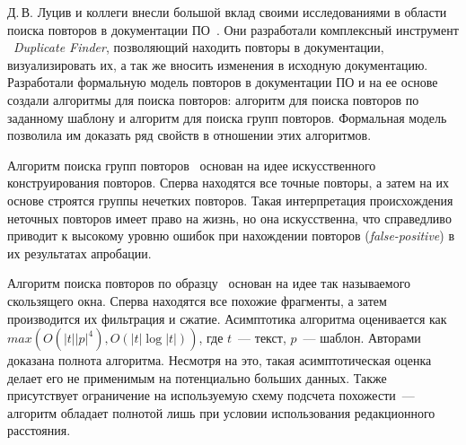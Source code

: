 

Д.\,В. Луцив и коллеги внесли большой вклад своими исследованиями в области поиска повторов в документации ПО~\cite{luciv2018detecting,luciv2018duplicate,luciv2019interactive,koznov2015clone,koznov2017duplicate,luciv2016fuzzy}. 
Они разработали комплексный инструмент \
\emph{Duplicate Finder}, позволяющий  находить повторы в документации, визуализировать их, а так же вносить изменения в исходную документацию.
Разработали формальную модель повторов в документации ПО и на ее основе создали алгоритмы для поиска повторов:  алгоритм для поиска повторов по заданному шаблону и  алгоритм для поиска групп повторов.
Формальная модель позволила им доказать ряд свойств в отношении этих алгоритмов.

Алгоритм поиска групп повторов~\cite{luciv2016fuzzy} основан на идее искусственного конструирования повторов.
Сперва находятся все точные повторы, а затем на их основе строятся группы нечетких повторов.
Такая интерпретация происхождения неточных повторов имеет право на жизнь, но она искусственна, что справедливо приводит к высокому уровню ошибок при нахождении повторов (\emph{false-positive}) в их результатах апробации.


Алгоритм поиска повторов по образцу~\cite{luciv2019interactive} основан на идее так называемого скользящего окна.
Сперва находятся все похожие фрагменты, а затем производится их фильтрация и сжатие.
Асимптотика алгоритма оценивается как $max(O(|t||p|^4),O(|t| \log |t|))$, где $t$~--- текст, $p$~--- шаблон.
Авторами доказана полнота алгоритма.
Несмотря на это, такая асимптотическая оценка делает его не применимым на потенциально больших данных.
Также присутствует ограничение на используемую схему подсчета похожести~--- алгоритм обладает полнотой лишь при условии использования редакционного расстояния.

